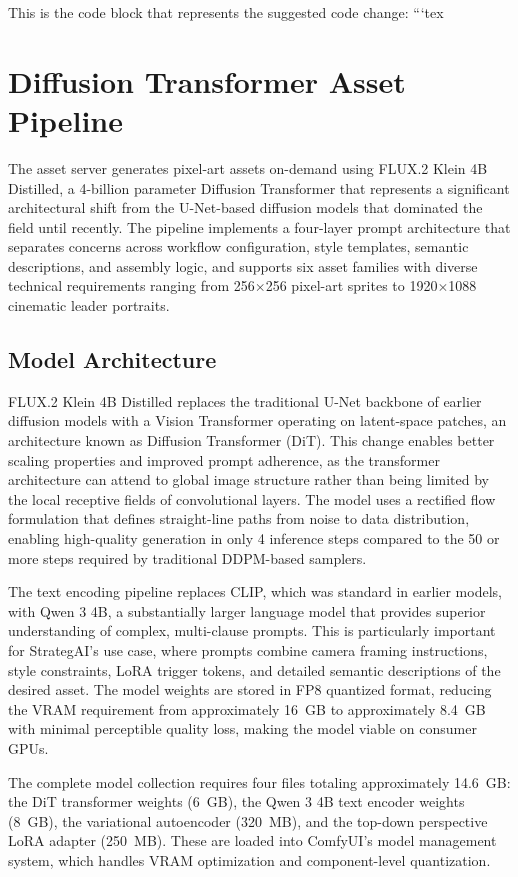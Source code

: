 \documentclass[conference]{IEEEtran}
\begin{document}
This is the code block that represents the suggested code change:
```tex
\section{Diffusion Transformer Asset Pipeline}
\label{sec:dit}

The asset server generates pixel-art assets on-demand using FLUX.2 Klein 4B Distilled, a 4-billion parameter Diffusion Transformer that represents a significant architectural shift from the U-Net-based diffusion models that dominated the field until recently. The pipeline implements a four-layer prompt architecture that separates concerns across workflow configuration, style templates, semantic descriptions, and assembly logic, and supports six asset families with diverse technical requirements ranging from 256$\times$256 pixel-art sprites to 1920$\times$1088 cinematic leader portraits.

\subsection{Model Architecture}

FLUX.2 Klein 4B Distilled replaces the traditional U-Net backbone of earlier diffusion models with a Vision Transformer operating on latent-space patches, an architecture known as Diffusion Transformer (DiT). This change enables better scaling properties and improved prompt adherence, as the transformer architecture can attend to global image structure rather than being limited by the local receptive fields of convolutional layers. The model uses a rectified flow formulation that defines straight-line paths from noise to data distribution, enabling high-quality generation in only 4 inference steps compared to the 50 or more steps required by traditional DDPM-based samplers.

The text encoding pipeline replaces CLIP, which was standard in earlier models, with Qwen 3 4B, a substantially larger language model that provides superior understanding of complex, multi-clause prompts. This is particularly important for StrategAI's use case, where prompts combine camera framing instructions, style constraints, LoRA trigger tokens, and detailed semantic descriptions of the desired asset. The model weights are stored in FP8 quantized format, reducing the VRAM requirement from approximately 16~GB to approximately 8.4~GB with minimal perceptible quality loss, making the model viable on consumer GPUs.

The complete model collection requires four files totaling approximately 14.6~GB: the DiT transformer weights (6~GB), the Qwen 3 4B text encoder weights (8~GB), the variational autoencoder (320~MB), and the top-down perspective LoRA adapter (250~MB). These are loaded into ComfyUI's model management system, which handles VRAM optimization and component-level quantization.
\end{document}
